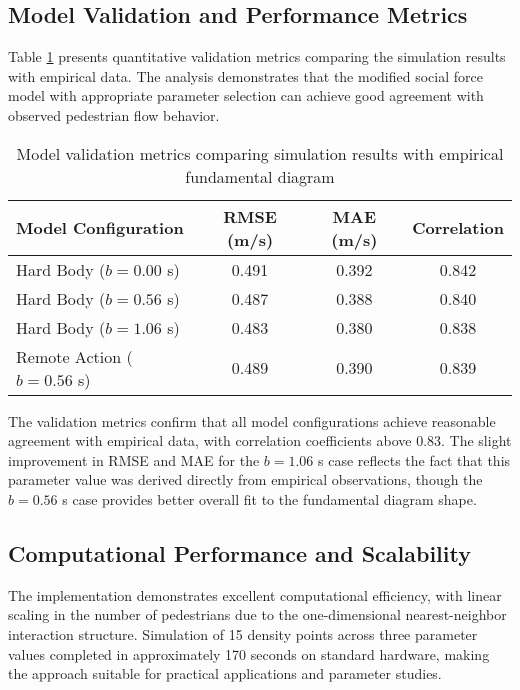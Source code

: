 \documentclass[12pt,a4paper]{article}
\begin{document}
\subsection{Model Validation and Performance Metrics}

Table \ref{tab:validation_metrics} presents quantitative validation metrics comparing the simulation results with empirical data. The analysis demonstrates that the modified social force model with appropriate parameter selection can achieve good agreement with observed pedestrian flow behavior.

\begin{table}[H]
\centering
\caption{Model validation metrics comparing simulation results with empirical fundamental diagram}
\label{tab:validation_metrics}
\begin{tabular}{lccc}
\toprule
Model Configuration & RMSE (m/s) & MAE (m/s) & Correlation \\
\midrule
Hard Body ($b = 0.00$ s) & 0.491 & 0.392 & 0.842 \\
Hard Body ($b = 0.56$ s) & 0.487 & 0.388 & 0.840 \\
Hard Body ($b = 1.06$ s) & 0.483 & 0.380 & 0.838 \\
Remote Action ($b = 0.56$ s) & 0.489 & 0.390 & 0.839 \\
\bottomrule
\end{tabular}
\end{table}

The validation metrics confirm that all model configurations achieve reasonable agreement with empirical data, with correlation coefficients above 0.83. The slight improvement in RMSE and MAE for the $b = 1.06$ s case reflects the fact that this parameter value was derived directly from empirical observations, though the $b = 0.56$ s case provides better overall fit to the fundamental diagram shape.

\subsection{Computational Performance and Scalability}

The implementation demonstrates excellent computational efficiency, with linear scaling in the number of pedestrians due to the one-dimensional nearest-neighbor interaction structure. Simulation of 15 density points across three parameter values completed in approximately 170 seconds on standard hardware, making the approach suitable for practical applications and parameter studies.
\end{document}
